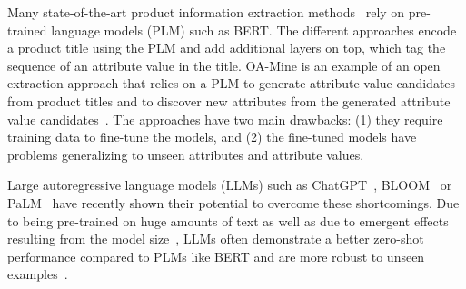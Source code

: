 
\begin{sloppypar}
Many state-of-the-art product information extraction methods~\cite{zhu_multimodal_2020, xu_scaling_2019, yang_mave_2022, zheng_opentag_2018}
rely on pre-trained language models (PLM) such as BERT.
The different approaches encode a product title using the PLM and add additional layers on top, which tag the sequence of an attribute value in the title.
OA-Mine is an example of an open extraction approach that relies on a PLM to generate attribute value candidates from product titles and to discover new attributes from the generated attribute value candidates~\cite{zhang_oa-mine_2022}.
The approaches have two main drawbacks: (1) they require training data to fine-tune the models, and (2) the fine-tuned models have problems generalizing to unseen attributes and attribute values.
\end{sloppypar}

Large autoregressive language models (LLMs) such as ChatGPT~\cite{ouyang_training_2022}, BLOOM~\cite{yong_bloom1_2023} or PaLM~\cite{chowdhery_palm_2022} have recently shown their potential to overcome these shortcomings. Due to being pre-trained on huge amounts of text as well as due to emergent effects resulting from the model size~\cite{wei_emergent_2022}, LLMs often demonstrate a better zero-shot performance compared to PLMs like BERT and are more robust to unseen examples~\cite{brown_language_2020}.

